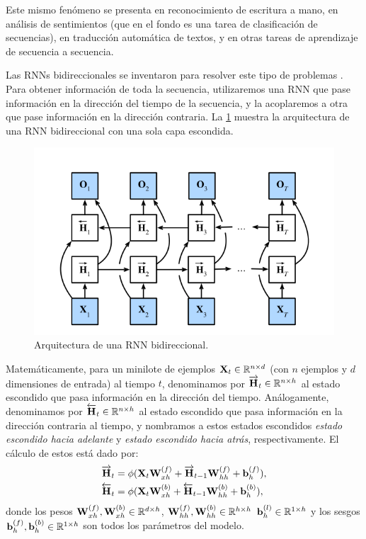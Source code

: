 \documentclass[12pt]{article}
\newcommand{\R}{\mathbb{R}}
\newcommand{\X}{\bm{\textbf X}}
\newcommand{\hi}{\bm{\textbf H}}
\newcommand{\we}{\bm{\textbf W}}
\newcommand{\bi}{\bm{\textbf b}}
\begin{document}
Este mismo fenómeno se presenta en reconocimiento de escritura a mano, en análisis de sentimientos (que en el fondo es una tarea de clasificación de secuencias), en traducción automática de textos, y en otras tareas de aprendizaje de secuencia a secuencia.

Las RNNs bidireccionales se inventaron para resolver este tipo de problemas \parencite{Schuster1997}. Para obtener información de toda la secuencia, utilizaremos una RNN que pase información en la dirección del tiempo de la secuencia, y la acoplaremos a otra que pase información en la dirección contraria. La \cref{fig:bidirectional-rnns} muestra la arquitectura de una RNN bidireccional con una sola capa escondida.

\begin{figure}
    \centering
    \includegraphics[width=0.7\linewidth]{images/bidirectional-rnns}
    \caption{Arquitectura de una RNN bidireccional.}
    \label{fig:bidirectional-rnns}
\end{figure}

Matemáticamente, para un minilote de ejemplos $ \X_t \in \R^{n \times d} $ (con $ n $ ejemplos y $ d $ dimensiones de entrada) al tiempo $ t $, denominamos por $ \overrightarrow{\hi}_t \in \R^{n \times h} $ al estado escondido que pasa información en la dirección del tiempo. Análogamente, denominamos por $ \overleftarrow{\hi}_t \in \R^{n \times h} $ al estado escondido que pasa información en la dirección contraria al tiempo, y nombramos a estos estados escondidos \textit{estado escondido hacia adelante} y \textit{estado escondido hacia atrás}, respectivamente. El cálculo de estos está dado por:
\begin{align}
    \overrightarrow{\hi}_t &= \phi(\X_t\we_{xh}^{(f)} + \overrightarrow{\hi}_{t-1}\we_{hh}^{(f)} + \bi_h^{(f)}), \\
    \overleftarrow{\hi}_t &= \phi(\X_t\we_{xh}^{(b)} + \overleftarrow{\hi}_{t-1}\we_{hh}^{(b)} + \bi_h^{(b)}),
\end{align}
donde los pesos $ \we_{xh}^{(f)}, \we_{xh}^{(b)} \in \R^{d \times h} $, $ \we_{hh}^{(f)}, \we_{hh}^{(b)} \in \R^{h \times h} $ $ \bi_h^{(l)} \in \R^{1 \times h} $ y los sesgos $ \bi_h^{(f)}, \bi_h^{(b)} \in \R^{1 \times h} $ son todos los parámetros del modelo.
\end{document}
